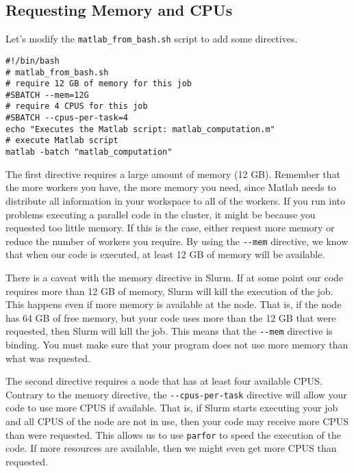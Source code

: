 \documentclass[12pt, a4paper]{article}
\begin{document}
\subsection{Requesting Memory and CPUs}
\label{sec:orgab1b46b}
Let's modify the \texttt{matlab\_from\_bash.sh} script to add some directives.
\lstset{language=bash,label= ,caption= ,captionpos=b,firstnumber=1,numbers=left,style=bash}
\begin{lstlisting}
#!/bin/bash
# matlab_from_bash.sh
# require 12 GB of memory for this job
#SBATCH --mem=12G
# require 4 CPUS for this job
#SBATCH --cpus-per-task=4
echo "Executes the Matlab script: matlab_computation.m"
# execute Matlab script
matlab -batch "matlab_computation"
\end{lstlisting}
The first directive requires a large amount of memory (12 GB).
Remember that the more workers you have, the more memory you need, since Matlab needs to distribute all information in your workspace to all of the workers.
If you run into problems executing a parallel code in the cluster, it might be because you requested too little memory.
If this is the case, either request more memory or reduce the number of workers you require.
By using the \texttt{-{}-mem} directive, we know that when our code is executed, at least 12 GB of memory will be available.

There is a caveat with the memory directive in Slurm.
If at some point our code requires more than 12 GB of memory, Slurm will kill the execution of the job.
This happens even if more memory is available at the node.
That is, if the node has 64 GB of free memory, but  your code uses more than the 12 GB that were requested, then Slurm will kill the job.
This means that the \texttt{-{}-mem} directive is binding.
You must make sure that your program does not use more memory than what was requested.

The second directive requires a node that has at least four available CPUS.
Contrary to the memory directive, the \texttt{-{}-cpus-per-task} directive will allow your code to use more CPUS if available.
That is, if Slurm starts executing your job and all CPUS of the node are not in use, then your code may receive more CPUS than were requested.
This allows us to use \texttt{parfor} to speed the execution of the code.
If more resources are available, then we might even get more CPUS than requested.
\end{document}
